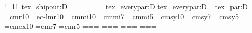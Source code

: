 %
%
\catcode`\@=11
\ifx\@@end\undefined \let\bench@end\end \else \let\bench@end\@@end \fi
\ifx\@@input\undefined \let\bench@input \else \let\bench@input\@@input \fi
\expandafter\let\expandafter\bench@shipout\csname tex_shipout:D\endcsname
\ifx\bench@shipout\relax \let\bench@shipout\shipout \fi
{}
\everypar={}\everymath={}\everydisplay={}\everyhbox={}\everyvbox={}\everycr={}
\expandafter\ifx\csname tex_everypar:D\endcsname\relax\else
  \csname tex_everypar:D\endcsname={}%
  \expandafter\let\expandafter\par\csname tex_par:D\endcsname
\fi
{}  \hfuzz=16383pt \vfuzz=16383pt
\parindent=0pt \parskip=0pt \baselineskip=12pt \lineskip=1pt \lineskiplimit=0pt
  \emergencystretch=0pt
  \hsize=345pt \vsize=600pt
\font\benchrm=cmr10 \font\benchlm=ec-lmr10
\font\benchmi=cmmi10 \font\benchmis=cmmi7 \font\benchmiss=cmmi5
\font\benchsy=cmsy10 \font\benchsys=cmsy7 \font\benchsyss=cmsy5
\font\benchex=cmex10 \font\benchrms=cmr7 \font\benchrmss=cmr5
=\benchrm {}=\benchrms {}=\benchrmss
{}=\benchmi {}=\benchmis {}=\benchmiss
{}=\benchsy {}=\benchsys {}=\benchsyss
{}=\benchex {}=\benchex {}=\benchex
\benchrm

